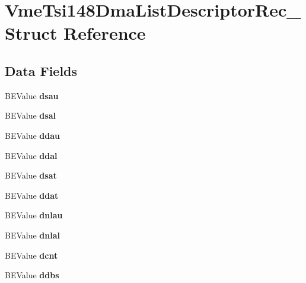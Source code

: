\hypertarget{structVmeTsi148DmaListDescriptorRec__}{}\section{Vme\+Tsi148\+Dma\+List\+Descriptor\+Rec\+\_\+ Struct Reference}
\label{structVmeTsi148DmaListDescriptorRec__}
\subsection*{Data Fields}
\begin{DoxyCompactItemize}
\item 
\mbox{\label{structVmeTsi148DmaListDescriptorRec___a05c00a5e405cb2bca37f45f09bdb2a01}} 
B\+E\+Value {\bfseries dsau}
\item 
\mbox{\label{structVmeTsi148DmaListDescriptorRec___a205901d03466265777792e06fd1a6d5e}} 
B\+E\+Value {\bfseries dsal}
\item 
\mbox{\label{structVmeTsi148DmaListDescriptorRec___afc820b85a2043dd6391836565c2ab5b4}} 
B\+E\+Value {\bfseries ddau}
\item 
\mbox{\label{structVmeTsi148DmaListDescriptorRec___ab3b0192fa61dc7d023c53f254ca70344}} 
B\+E\+Value {\bfseries ddal}
\item 
\mbox{\label{structVmeTsi148DmaListDescriptorRec___a027af8ed322f59839496e1c6580f132e}} 
B\+E\+Value {\bfseries dsat}
\item 
\mbox{\label{structVmeTsi148DmaListDescriptorRec___a0ff436e8682f0e8881a40a5b16f9ecdb}} 
B\+E\+Value {\bfseries ddat}
\item 
\mbox{\label{structVmeTsi148DmaListDescriptorRec___a1e5e9f7d7fd0328a44b11a2baf92bb44}} 
B\+E\+Value {\bfseries dnlau}
\item 
\mbox{\label{structVmeTsi148DmaListDescriptorRec___aa29d61a8f649aabba5e624edb12efa28}} 
B\+E\+Value {\bfseries dnlal}
\item 
\mbox{\label{structVmeTsi148DmaListDescriptorRec___a1b40d6b36b490e60d6acbd9ed816b65c}} 
B\+E\+Value {\bfseries dcnt}
\item 
\mbox{\label{structVmeTsi148DmaListDescriptorRec___aaf35c31f4a08d1c69102f027e7927824}} 
B\+E\+Value {\bfseries ddbs}
\end{DoxyCompactItemize}


